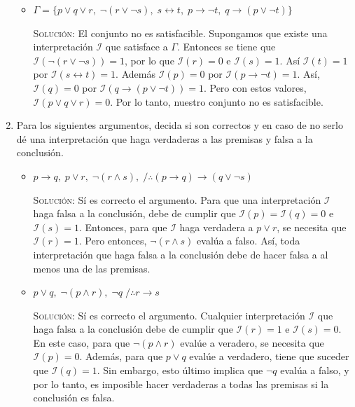 \documentclass[letterpaper,11pt]{article}
\begin{document}
\begin{enumerate}
\begin{itemize}
        \item $\Gamma = \{p \lor q \lor r, \; \neg (r \lor \neg s), \; s ↔ t, \;
                          p → \neg t, \; q → (p \lor \neg t)\}$     
        
        \textsc{Solución:} El conjunto no es satisfacible. Supongamos que existe
        una interpretación $\mathcal{I}$ que satisface a $\Gamma$. Entonces se 
        tiene que $\mathcal{I}(\neg (r \lor \neg s)) = 1$, por lo que 
        $\mathcal{I}(r) = 0$ e $\mathcal{I}(s) = 1$. Así $\mathcal{I}(t) = 1$ por 
        $\mathcal{I}(s ↔ t) = 1$. Además $\mathcal{I}(p) = 0$ por 
        $\mathcal{I}(p → \neg t) = 1$. Así, $\mathcal{I}(q) = 0$ por 
        $\mathcal{I}(q → (p \lor \neg t)) = 1$. Pero con estos valores,
        $\mathcal{I}(p \lor q \lor r) = 0$. Por lo tanto, nuestro conjunto no 
        es satisfacible.
    \end{itemize}

    \item Para los siguientes argumentos, decida si son correctos y en caso de 
    no serlo dé una interpretación que haga verdaderas a las premisas y falsa 
    a la conclusión.

    \begin{itemize}
        \item $p → q, \; p \lor r, \; \neg (r \land s), \; /∴ (p → q) → 
               (q \lor \neg s)$

        \textsc{Solución:} Sí es correcto el argumento. Para que una 
        interpretación $\mathcal{I}$ haga falsa a la conclusión, debe de 
        cumplir que $\mathcal{I}(p) = \mathcal{I}(q) = 0$ e $\mathcal{I}(s) = 1$.
        Entonces, para que $\mathcal{I}$ haga verdadera a $p \lor r$, se necesita
        que $\mathcal{I}(r) = 1$. Pero entonces, $\neg (r \land s)$ evalúa a 
        falso. Así, toda interpretación que haga falsa a la conclusión debe de  
        hacer falsa a al menos una de las premisas. 

        \item $p \lor q, \; \neg (p \land r), \; \neg q \; /∴ r → s$
        
        \textsc{Solución:} Sí es correcto el argumento. Cualquier interpretación
        $\mathcal{I}$ que haga falsa a la conclusión debe de cumplir que 
        $\mathcal{I}(r) = 1$ e $\mathcal{I}(s) = 0$. En este caso, para que 
        $\neg (p \land r)$ evalúe a veradero, se necesita que $\mathcal{I}(p) = 0$.
        Además, para que $p \lor q$ evalúe a verdadero, tiene que suceder que 
        $\mathcal{I}(q) = 1$. Sin embargo, esto último implica que $\neg q$ 
        evalúa a falso, y por lo tanto, es imposible hacer verdaderas a todas las 
        premisas si la conclusión es falsa.
    \end{itemize}


\end{enumerate}
\end{document}
